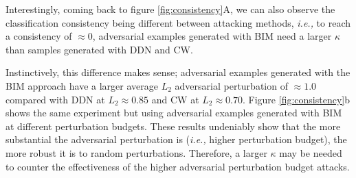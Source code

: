 Interestingly, coming back to figure \ref{fig:consistency}A, we can also observe
the classification consistency being different between attacking methods,
\emph{i.e.,} to reach a consistency of $\approx 0$, adversarial examples
generated with BIM need a larger $\kappa$ than samples generated with DDN and
CW.

Instinctively, this difference makes sense; adversarial examples generated with
the BIM approach have a larger average $L_2$ adversarial perturbation of
$\approx 1.0$ compared with DDN at $L_2\approx0.85$ and CW at $L_2\approx0.70$.
Figure \ref{fig:consistency}b shows the same experiment but using adversarial
examples generated with BIM at different perturbation budgets. These results
undeniably show that the more substantial the adversarial perturbation is
(\emph{i.e.,} higher perturbation budget), the more robust it is to random
perturbations. Therefore, a larger $\kappa$ may be needed to counter the
effectiveness of the higher adversarial perturbation budget attacks.

